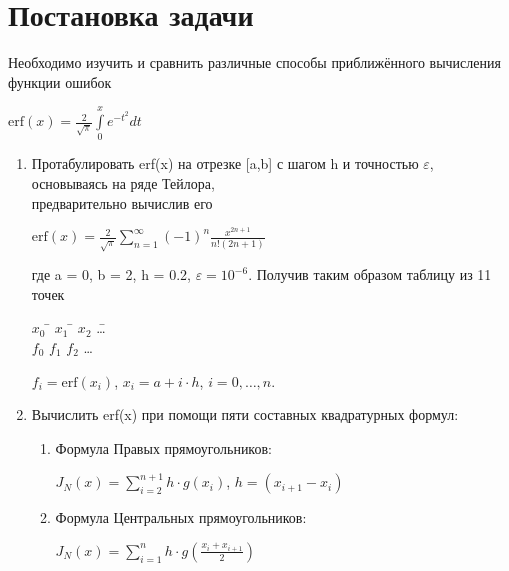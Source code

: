 \documentclass[14pt]{article}
\begin{document}
\newpage
\begin{center}
\renewcommand{\contentsname}{Содержание}
\tableofcontents
\newpage
\end{center}
\newpage
\section{Постановка задачи}
\hspace{5mm}Необходимо изучить и сравнить различные способы приближённого вычисления функции ошибок
\begin{center}
    $\text{erf}(x) =\displaystyle\frac{2}{\sqrt{\pi}} \displaystyle\int\limits_{0}^{x} e^{-t^2} dt$
\end{center}
\begin{enumerate}
    \item Протабулировать erf(x) на отрезке [a,b] с шагом h и точностью $ \varepsilon$, основываясь на ряде Тейлора,\\
     предварительно вычислив его
     \begin{center}
        $\text{erf}(x) =\displaystyle\frac{2}{\sqrt{\pi}} \displaystyle\sum\limits_{n=1}^{\infty}(-1)^n\displaystyle\frac{x^{2n+1}}{n!(2n+1)} $
    \end{center}
    где a = 0, b = 2, h = 0.2, $\varepsilon = 10^{-6}$. Получив таким образом таблицу из 11 точек
    \begin{tabbing}
        $x_0$ \= $x_1$ \= $x_2$ \= \dots\\
        $f_0$ \> $f_1$ \> $f_2$ \> \dots\\
    \end{tabbing}
    $f_i = \text{erf}(x_i)$, $x_i = a + i \cdot h$, $i = 0,\dots,n.$
    \item {Вычислить erf(x) при помощи пяти составных квадратурных формул:
        \begin{enumerate}
            \item {
                Формула Правых прямоугольников:
                \begin{center}
                    $J_N(x) = \displaystyle\sum_{i=2}^{n+1}h \cdot g(x_i)$, $h=(x_{i+1} - x_i)$
                \end{center}
                }
            \item {
                Формула Центральных прямоугольников:
                \begin{center}
                    $J_N(x) = \displaystyle\sum_{i=1}^{n}h \cdot g\left(\displaystyle\frac{x_i + x_{i+1}}{2}\right)$  
                \end{center}
}
\end{enumerate}}
\end{enumerate}
\end{document}
